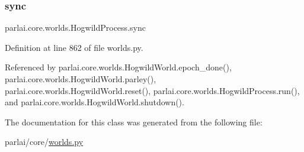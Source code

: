 \mbox{\label{classparlai_1_1core_1_1worlds_1_1HogwildProcess_a7bf5f7806e93a6b1ecb02fd12fa4a01f}} 
\subsubsection{\texorpdfstring{sync}{sync}}
{\footnotesize\ttfamily parlai.\+core.\+worlds.\+Hogwild\+Process.\+sync}



Definition at line 862 of file worlds.\+py.



Referenced by parlai.\+core.\+worlds.\+Hogwild\+World.\+epoch\+\_\+done(), parlai.\+core.\+worlds.\+Hogwild\+World.\+parley(), parlai.\+core.\+worlds.\+Hogwild\+World.\+reset(), parlai.\+core.\+worlds.\+Hogwild\+Process.\+run(), and parlai.\+core.\+worlds.\+Hogwild\+World.\+shutdown().



The documentation for this class was generated from the following file\+:\begin{DoxyCompactItemize}
\item 
parlai/core/\hyperlink{parlai_2core_2worlds_8py}{worlds.\+py}\end{DoxyCompactItemize}
